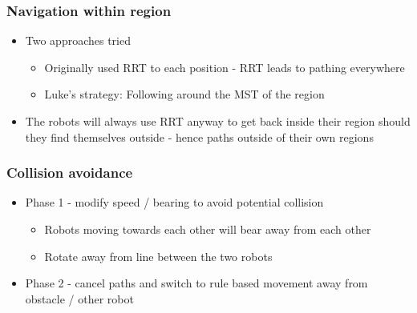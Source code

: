 \documentclass{beamer}
\begin{document}
	
	
	\begin{frame}
		\frametitle{Navigation within region}
		
		\begin{itemize}
			\item Two approaches tried
			\begin{itemize}
				\item Originally used RRT to each position - RRT leads to pathing everywhere
				\item Luke's strategy: Following around the MST of the region
			\end{itemize}
			\item The robots will always use RRT anyway to get back inside their region should they find themselves outside - hence paths outside of their own regions
		\end{itemize}
		
	\end{frame}
	
	\begin{frame}
		\frametitle{Collision avoidance}
		
		\begin{itemize}
			\item Phase 1 - modify speed / bearing to avoid potential collision
			\begin{itemize}
				\item Robots moving towards each other will bear away from each other
				\item Rotate away from line between the two robots
			\end{itemize}
			\item Phase 2 - cancel paths and switch to rule based movement away from obstacle / other robot
		\end{itemize}
	\end{frame}
	
\end{document}
